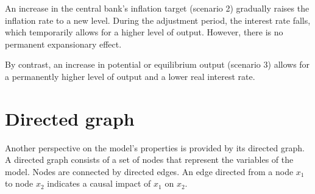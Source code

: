 \documentclass[
  letterpaper,
  DIV=11,
  numbers=noendperiod]{scrreprt}
\begin{document}
An increase in the central bank's inflation target (scenario 2)
gradually raises the inflation rate to a new level. During the
adjustment period, the interest rate falls, which temporarily allows for
a higher level of output. However, there is no permanent expansionary
effect.

By contrast, an increase in potential or equilibrium output (scenario 3)
allows for a permanently higher level of output and a lower real
interest rate.

\section{Directed graph}\label{directed-graph-6}

Another perspective on the model's properties is provided by its
directed graph. A directed graph consists of a set of nodes that
represent the variables of the model. Nodes are connected by directed
edges. An edge directed from a node \(x_1\) to node \(x_2\) indicates a
causal impact of \(x_1\) on \(x_2\).
\end{document}
